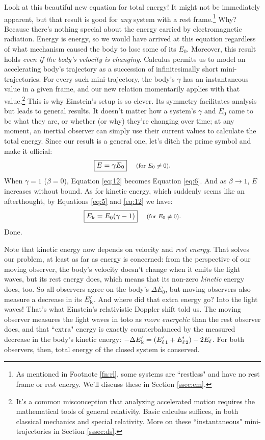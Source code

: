 \documentclass[12pt]{article}
\begin{document}
Look at this beautiful new equation for total energy! It might not be immediately apparent, but that result is good for \emph{any} system with a rest frame.\footnote{As mentioned in Footnote \ref{fn:rl}, some systems are ``restless" and have no rest frame or rest energy. We'll discuss these in Section \ref{ssec:em}.} Why? Because there's nothing special about the energy carried by electromagnetic radiation. Energy is energy, so we would have arrived at this equation regardless of what mechanism caused the body to lose some of its $E_0$. Moreover, this result holds \emph{even if the body's velocity is changing}. Calculus permits us to model an accelerating body's trajectory as a succession of infinitesimally short mini-trajectories. For every such mini-trajectory, the body's $\gamma$ has an instantaneous value in a given frame, and our new relation momentarily applies with that value.\footnote{It's a common misconception that analyzing accelerated motion requires the mathematical tools of general relativity. Basic calculus suffices, in both classical mechanics and special relativity. More on these ``instantaneous" mini-trajectories in Section \ref{sssec:ds}.} This is why Einstein's setup is so clever. Its symmetry facilitates analysis but leads to general results. It doesn't matter how a system's $\gamma$ and $E_0$ came to be what they are, or whether (or why) they're changing over time; at any moment, an inertial observer can simply use their current values to calculate the total energy. Since our result is a general one, let's ditch the prime symbol and make it official:
\begin{equation}\label{eq:12}
\boxed{E = \gamma E_0} \quad \textrm{\footnotesize{ (for $E_0 \neq 0$)}}.
\end{equation}
When $\gamma=1$ ($\beta=0$), Equation \ref{eq:12} becomes Equation \ref{eq:6}. And as $\beta \rightarrow 1$, $E$ increases without bound. As for kinetic energy, which suddenly seems like an afterthought, by Equations \ref{eq:5} and \ref{eq:12} we have:
\begin{equation}\label{eq:13}
\boxed{E_{\mkern.5mu \textrm{k}} = E_0 (\gamma - 1)} \quad \textrm{\footnotesize{ (for $E_0 \neq 0$)}}.
\end{equation}
Done.

Note that kinetic energy now depends on velocity and \emph{rest energy}. That solves our problem, at least as far as energy is concerned: from the perspective of our moving observer, the body's velocity doesn't change when it emits the light waves, but its rest energy does, which means that its non-zero \emph{kinetic} energy does, too. So all observers agree on the body's $\Delta E_0$, but moving observers also measure a decrease in its $E_{\mkern.5mu \textrm{k}}^\prime$. And where did that extra energy go? Into the light waves! That's what Einstein's relativistic Doppler shift told us. The moving observer measures the light waves in toto as \emph{more energetic} than the rest observer does, and that ``extra" energy is exactly counterbalanced by the measured decrease in the body's kinetic energy: $-\Delta E_{\mkern.5mu \textrm{k}}^\prime = (E_{\ell \, 1}^{\prime} + E_{\ell \, 2}^{\prime}) - 2E_{\ell}$. For both observers, then, total energy of the closed system is conserved.
\end{document}
